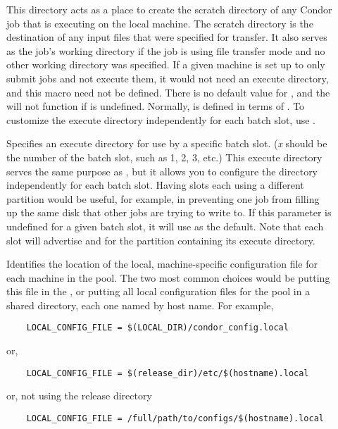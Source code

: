 \begin{description}
\item[] \label{param:Execute} This directory acts as
  a place to create the scratch directory of any Condor job that is executing
  on
  the local machine.  The scratch directory is the destination of
  any input files that were specified for transfer.  It also serves
  as the job's working directory if the job is using file transfer
  mode and no other working directory was specified.
  If a given machine is set up to only submit
  jobs and not execute them, it would not need an execute directory,
  and this macro need not be defined.  There is no default value for
  , and the  will not function if
   is undefined.  Normally,  is
  defined in terms of .  To customize the execute
  directory independently for each batch slot, use .

\item[] \label{param:SlotXExecute} Specifies an
  execute directory for use by a specific batch slot.  (\emph{x}
  should be the number of the batch slot, such as 1, 2, 3, etc.)  This
  execute directory serves the same purpose as , but it
  allows you to configure the directory independently for each batch
  slot.  Having slots each using a different partition would be
  useful, for example, in preventing one job from filling up the same
  disk that other jobs are trying to write to.  If this parameter is
  undefined for a given batch slot, it will use  as
  the default.  Note that each slot will advertise 
  and  for the partition containing its execute
  directory.

\item[] \label{param:LocalConfigFile}
  Identifies the
  location of the local, machine-specific configuration
  file for each machine
  in the pool.  The two most common choices would be putting this
  file in the , or putting all
  local configuration files for the pool in a shared directory, each one
  named by host name.  For example,
  \begin{verbatim}
    LOCAL_CONFIG_FILE = $(LOCAL_DIR)/condor_config.local
  \end{verbatim}
  or,
  \begin{verbatim}
    LOCAL_CONFIG_FILE = $(release_dir)/etc/$(hostname).local
  \end{verbatim}
  or, not using the release directory
  \begin{verbatim}
    LOCAL_CONFIG_FILE = /full/path/to/configs/$(hostname).local
  \end{verbatim}
  

\end{description}

